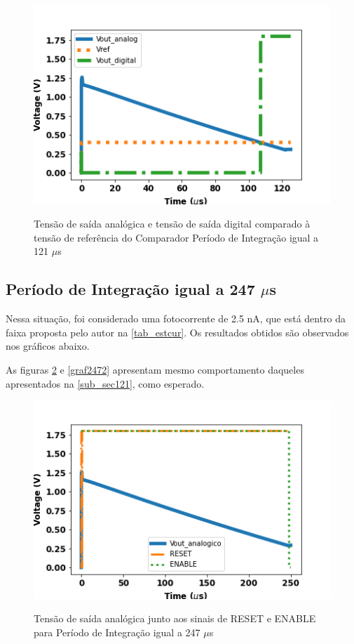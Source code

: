 \begin{figure}[!h]
 \centering
    \caption{Tensão de saída analógica e tensão de saída digital comparado à tensão de referência do Comparador Período de Integração igual a 121 $\mu$s} 
    \includegraphics[scale=0.6]{Resultados/Graficos/analogicoedigital-tb_pixel125.png}
    \label{graf1252}
\end{figure}

\subsection{Período de Integração igual a 247 $\mu$s}
\label{sub_sec247}

Nessa situação, foi considerado uma fotocorrente de 2.5 nA, que está dentro da faixa proposta pelo autor na \autoref{tab_estcur}. Os resultados obtidos são observados nos gráficos abaixo.

As figuras \ref{graf247} e \ref{graf2472} apresentam mesmo comportamento daqueles apresentados na \autoref{sub_sec121}, como esperado.

\begin{figure}[!h]
 \centering
    \centering
    \caption{Tensão de saída analógica junto aos sinais de RESET e ENABLE para Período de Integração igual a 247 $\mu$s}
    \includegraphics[scale=0.6]{Resultados/Graficos/reseteenable-tb_pixel250.png}
    \label{graf247}
\end{figure}

